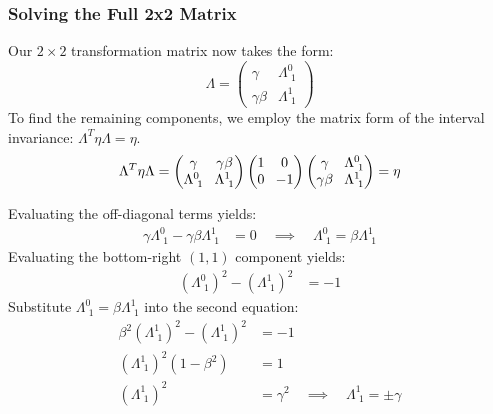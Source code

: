\subsubsection*{Solving the Full 2x2 Matrix}
Our $2\times 2$ transformation matrix now takes the form:
\begin{equation}\label{eq:lec04:boost-matrix-partial}
    \Lambda = 
    \begin{pmatrix}
        \gamma & \Lambda^0_{\,\,1} \\
        \gamma \beta & \Lambda^1_{\,\,1}
    \end{pmatrix}
\end{equation}
To find the remaining components, we employ the matrix form of the interval invariance: $\Lambda^T \eta \Lambda = \eta$. 
\begin{equation}\label{eq:lec04:matrix-product}
    \setlength{\arraycolsep}{4pt}
    \Lambda^T \eta \Lambda =
    \begin{pmatrix}
        \gamma & \gamma \beta \\
        \Lambda^0_{\,\,1} & \Lambda^1_{\,\,1}
    \end{pmatrix}
    \begin{pmatrix}
        1 & 0 \\
        0 & -1
    \end{pmatrix}
    \begin{pmatrix}
        \gamma & \Lambda^0_{\,\,1} \\
        \gamma \beta & \Lambda^1_{\,\,1}
    \end{pmatrix}
    =
    \eta
\end{equation}

Evaluating the off-diagonal terms yields:
\begin{align}
    \gamma \Lambda^0_{\,\,1} - \gamma \beta \Lambda^1_{\,\,1} &= 0 \quad \implies \quad \Lambda^0_{\,\,1} = \beta \Lambda^1_{\,\,1}
    \label{eq:lec04:off-diagonal}
\end{align}
Evaluating the bottom-right $(1,1)$ component yields:
\begin{align}
    (\Lambda^0_{\,\,1})^2 - (\Lambda^1_{\,\,1})^2 &= -1
    \label{eq:lec04:bottom-right}
\end{align}
Substitute $\Lambda^0_{\,\,1} = \beta \Lambda^1_{\,\,1}$ into the second equation:
\begin{align}
    \beta^2 (\Lambda^1_{\,\,1})^2 - (\Lambda^1_{\,\,1})^2 &= -1 \\
    (\Lambda^1_{\,\,1})^2 (1 - \beta^2) &= 1 \\
    (\Lambda^1_{\,\,1})^2 &= \gamma^2 \quad \implies \quad \Lambda^1_{\,\,1} = \pm \gamma
    \label{eq:lec04:lambda11pm}
\end{align}

